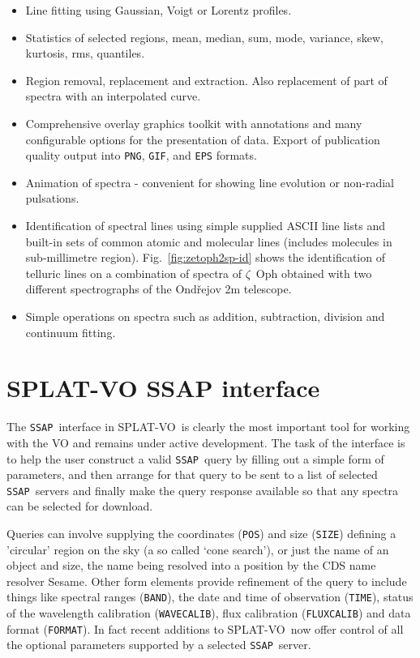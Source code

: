 \documentclass[final,authoryear,5p,times,twocolumn]{elsarticle}
\newcommand{\ssap}{\texttt{SSAP}}
\newcommand{\splatvo}{{\textsf{\small{SPLAT-VO}}}}
\newcommand{\Sesame}{\textsf{\small Sesame}}
\begin{document}
\begin{itemize}
\item Line fitting using Gaussian, Voigt or Lorentz profiles.

\item Statistics of selected regions, mean, median, sum, mode, variance, skew,
kurtosis, rms, quantiles.

\item Region removal, replacement and extraction. Also replacement of part of
spectra with an interpolated curve.

\item Comprehensive overlay graphics toolkit with annotations and many
configurable options for the presentation of data. Export of publication
quality output into \texttt{PNG}, \texttt{GIF}, and \texttt{EPS} formats.

\item Animation of spectra - convenient for showing line evolution or
non-radial pulsations.

\item Identification of spectral lines using simple supplied ASCII line lists
and built-in sets of common atomic and molecular lines (includes molecules in
sub-millimetre region). Fig.~\ref{fig:zetoph2sp-id} shows the identification of
telluric lines on a combination of spectra of $\zeta$~Oph obtained with two
different spectrographs of the Ond\v{r}ejov 2m telescope.

\item Simple operations on spectra such as addition, subtraction, division and
continuum fitting.

\end{itemize}

\section{SPLAT-VO SSAP interface}
%
The \ssap\ interface in \splatvo\ is clearly the most important tool for
working with the VO and remains under active development. The task of the
interface is to help the user construct a valid \ssap\ query by filling out a
simple form of parameters, and then arrange for that query to be sent to a list
of selected \ssap\ servers and finally make the query response available so
that any spectra can be selected for download.

Queries can involve supplying the coordinates (\texttt{POS}) and size
(\texttt{SIZE}) defining a 'circular' region on the sky (a so called `cone
search'), or just the name of an object and size, the name being resolved into
a position by the CDS name resolver \Sesame . Other form elements provide
refinement of the query to include things like spectral ranges (\texttt{BAND}),
the date and time of observation (\texttt{TIME}), status of the wavelength
calibration (\texttt{WAVECALIB}), flux calibration (\texttt{FLUXCALIB}) and
data format (\texttt{FORMAT}).  In fact recent additions to \splatvo\ now offer
control of all the optional parameters supported by a selected \ssap\ server.
\end{document}
